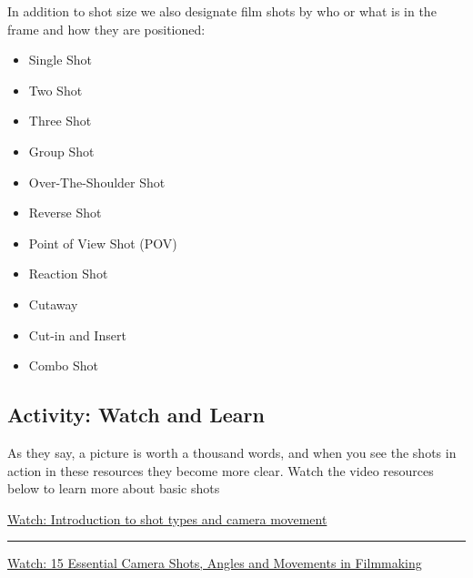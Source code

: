 \documentclass[
]{book}
\providecommand{\tightlist}{%
  \setlength{\itemsep}{0pt}\setlength{\parskip}{0pt}}
\begin{document}
In addition to shot size we also designate film shots by who or what is in the frame and how they are positioned:

\begin{itemize}
\tightlist
\item
  Single Shot\\
\item
  Two Shot\\
\item
  Three Shot\\
\item
  Group Shot\\
\item
  Over-The-Shoulder Shot\\
\item
  Reverse Shot\\
\item
  Point of View Shot (POV)\\
\item
  Reaction Shot\\
\item
  Cutaway\\
\item
  Cut-in and Insert\\
\item
  Combo Shot
\end{itemize}

\hypertarget{activity-watch-and-learn-1}{%
\subsection*{Activity: Watch and Learn}\label{activity-watch-and-learn-1}}

\begin{reflect}
As they say, a picture is worth a thousand words, and when you see the shots in action in these resources they become more clear. Watch the video resources below to learn more about basic shots

\href{https://www.youtube.com/watch?v=lRo2IqYbEaE}{Watch: Introduction to shot types and camera movement}

\begin{center}\rule{0.5\linewidth}{0.5pt}\end{center}

\href{https://www.youtube.com/watch?v=7y0ouVBcogU}{Watch: 15 Essential Camera Shots, Angles and Movements in Filmmaking}
\end{reflect}
\end{document}
